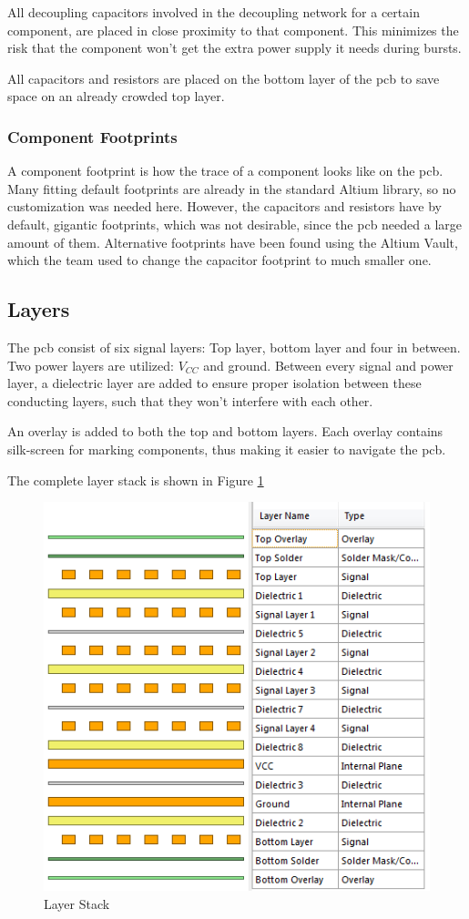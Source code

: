 All decoupling capacitors involved in the decoupling network for a certain component, are placed in close proximity to that component.
This minimizes the risk that the component won't get the extra power supply it needs during bursts.

All capacitors and resistors are placed on the bottom layer of the \gls{pcb} to save space on an already crowded top layer.

\subsubsection{Component Footprints}
A component footprint is how the trace of a component looks like on the \gls{pcb}.
Many fitting default footprints are already in the standard Altium library, so no customization was needed here.
However, the capacitors and resistors have by default, gigantic footprints, which was not desirable, since the \gls{pcb} needed a large amount of them.
Alternative footprints have been found using the Altium Vault, which the team used to change the capacitor footprint to much smaller one.

\subsection{Layers}
The \gls{pcb} consist of six signal layers: Top layer, bottom layer and four in between.
Two power layers are utilized: \(V_{CC}\) and ground.
Between every signal and power layer, a dielectric layer are added to ensure proper isolation between these conducting layers, such that they won't interfere with each other.

An overlay is added to both the top and bottom layers.
Each overlay contains silk-screen for marking components, thus making it easier to navigate the \gls{pcb}.

The complete layer stack is shown in Figure \ref{fig:Layers}

\begin{figure}[h!]
\centering
\includegraphics[scale = 0.8]{images/Layers.png}
\caption{Layer Stack}
\label{fig:Layers}
\end{figure}

